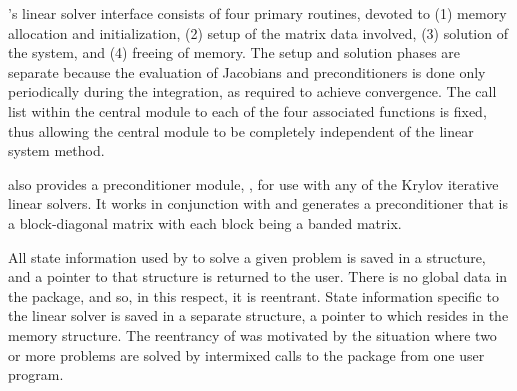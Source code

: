 {\ida}'s linear solver interface consists of four primary routines,
devoted to (1) memory allocation and initialization, (2) setup of the
matrix data involved, (3) solution of the system, and (4) freeing of memory.  
The setup and solution phases are separate because the evaluation of
Jacobians and preconditioners is done only periodically during the
integration, as required to achieve convergence. The call list within
the central {\ida} module to each of the four associated functions is
fixed, thus allowing the central module to be completely independent
of the linear system method.

{\ida} also provides a preconditioner module, {\idabbdpre}, for use
with any of the Krylov iterative linear solvers.  It works in
conjunction with {\nvecp} and generates a preconditioner that is a  
block-diagonal matrix with each block being a banded matrix.

All state information used by {\ida} to solve a given problem is saved
in a structure, and a pointer to that structure is returned to the
user.  There is no global data in the {\ida} package, and so, in this
respect, it is reentrant. State information specific to the linear
solver is saved in a separate structure, a pointer to which resides in
the {\ida} memory structure. The reentrancy of {\ida} was motivated
by the situation where two or more problems are solved by
intermixed calls to the package from one user program.
